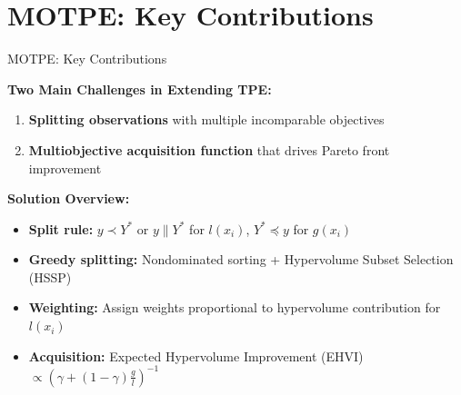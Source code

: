 \documentclass[aspectratio=169, 12pt]{beamer}
\begin{document}
\section{MOTPE: Key Contributions}
\begin{frame}{MOTPE: Key Contributions}

\textbf{Two Main Challenges in Extending TPE:}

\begin{enumerate}
    \item \textbf{Splitting observations} with multiple incomparable objectives
    \item \textbf{Multiobjective acquisition function} that drives Pareto front improvement
\end{enumerate}

\vspace{0.5cm}

\textbf{Solution Overview:}
\begin{itemize}
    \item \textbf{Split rule:} \(y \prec Y^*\) or \(y \parallel Y^*\) for \(l(x_i)\), \(Y^* \preceq y\) for \(g(x_i)\)
    \item \textbf{Greedy splitting:} Nondominated sorting + Hypervolume Subset Selection (HSSP)
    \item \textbf{Weighting:} Assign weights proportional to hypervolume contribution for \(l(x_i)\)
    \item \textbf{Acquisition:} Expected Hypervolume Improvement (EHVI) $\propto \left(\gamma + (1-\gamma)\frac{g}{l}\right)^{-1}$
\end{itemize}

\end{frame}
\end{document}
